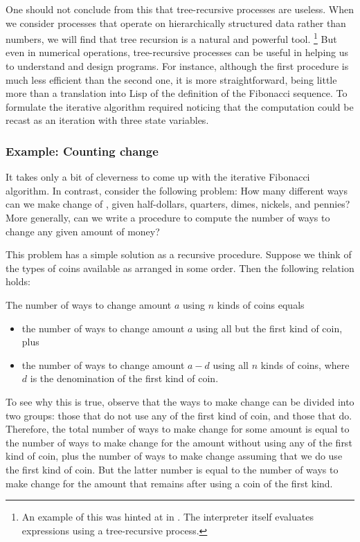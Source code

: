 One should not conclude from this that tree-recursive processes are useless.
When we consider processes that operate on hierarchically structured data rather than numbers, we will find that tree recursion is a natural and powerful tool.%
\footnote{
	An example of this was hinted at in .
	The interpreter itself evaluates expressions using a tree-recursive process.
}
But even in numerical operations, tree-recursive processes can be useful in helping us to understand and design programs.
For instance, although the first  procedure is much less efficient than the second one, it is more straightforward, being little more than a translation into Lisp of the definition of the Fibonacci sequence.
To formulate the iterative algorithm required noticing that the computation could be recast as an iteration with three state variables.



\subsubsection*{Example: Counting change}

It takes only a bit of cleverness to come up with the iterative Fibonacci algorithm.
In contrast, consider the following problem:
How many different ways can we make change of , given half-dollars, quarters, dimes, nickels, and pennies?
More generally, can we write a procedure to compute the number of ways to change any given amount of money?

This problem has a simple solution as a recursive procedure.
Suppose we think of the types of coins available as arranged in some order.
Then the following relation holds:

The number of ways to change amount \( a \) using \( n \) kinds of coins equals
\begin{itemize}

	\item
		the number of ways to change amount \( a \) using all but the first kind of coin, plus

	\item
		the number of ways to change amount \( a - d \) using all \( n \) kinds of coins, where \( d \) is the denomination of the first kind of coin.

\end{itemize}

To see why this is true, observe that the ways to make change can be divided into two groups:
those that do not use any of the first kind of coin, and those that do.
Therefore, the total number of ways to make change for some amount is equal to the number of ways to make change for the amount without using any of the first kind of coin, plus the number of ways to make change assuming that we do use the first kind of coin.
But the latter number is equal to the number of ways to make change for the amount that remains after using a coin of the first kind.

